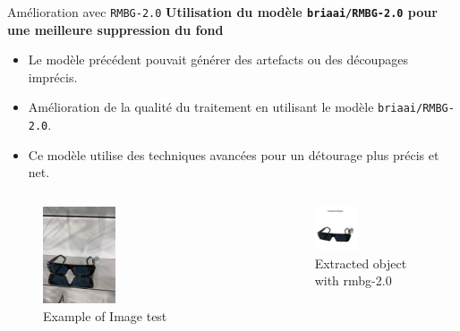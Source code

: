 \documentclass{beamer}
\begin{document}
\begin{frame}{Amélioration avec \texttt{RMBG-2.0}}
    \footnotesize
    \textbf{Utilisation du modèle \texttt{briaai/RMBG-2.0} pour une meilleure suppression du fond}
    \begin{itemize}
        \item Le modèle précédent pouvait générer des artefacts ou des découpages imprécis.
        \item Amélioration de la qualité du traitement en utilisant le modèle \texttt{briaai/RMBG-2.0}.
        \item Ce modèle utilise des techniques avancées pour un détourage plus précis et net.
    \end{itemize}
    \begin{columns}
        \begin{figure}
            \includegraphics[width=0.4\textwidth]{assets/IMG_6883.jpg}
            \caption{Example of Image test}
        \end{figure}
        \begin{figure}
            \includegraphics[width=0.4\textwidth]{assets/glasses_rmbg_2.png}
            \caption{Extracted object with rmbg-2.0}
        \end{figure}
    \end{columns}
\end{frame}
\end{document}

